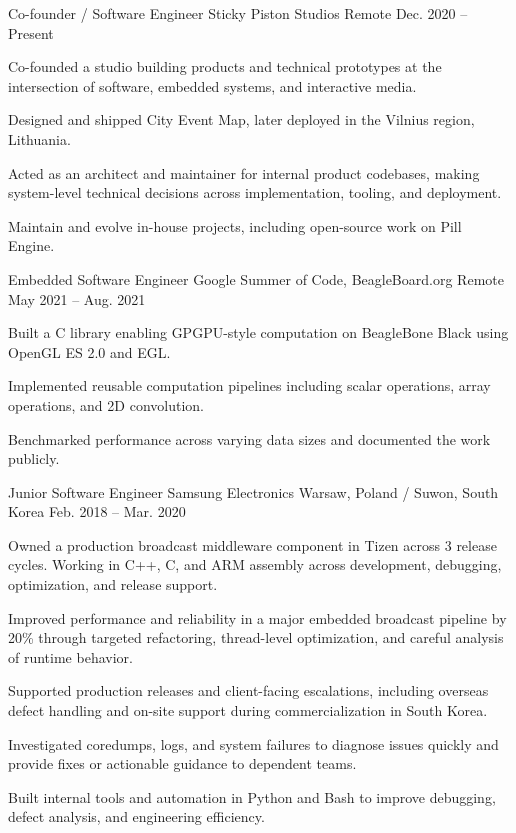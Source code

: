 \begin{cventries}
  \cventry
  {Co-founder / Software Engineer}
  {Sticky Piston Studios}
  {Remote}
  {Dec. 2020 -- Present}
  {
    \begin{cvitems}
      \item {Co-founded a studio building products and technical prototypes at the intersection of software, embedded systems, and interactive media.}
      \item {Designed and shipped City Event Map, later deployed in the Vilnius region, Lithuania.}
      \item {Acted as an architect and maintainer for internal product codebases, making system-level technical decisions across implementation, tooling, and deployment.}
      \item {Maintain and evolve in-house projects, including open-source work on Pill Engine.}
    \end{cvitems}
  }

  \cventry
  {Embedded Software Engineer}
  {Google Summer of Code, BeagleBoard.org}
  {Remote}
  {May 2021 -- Aug. 2021}
  {
    \begin{cvitems}
      \item {Built a C library enabling GPGPU-style computation on BeagleBone Black using OpenGL ES 2.0 and EGL.}
      \item {Implemented reusable computation pipelines including scalar operations, array operations, and 2D convolution.}
      \item {Benchmarked performance across varying data sizes and documented the work publicly.}
    \end{cvitems}
  }

  \cventry
  {Junior Software Engineer}
  {Samsung Electronics}
  {Warsaw, Poland / Suwon, South Korea}
  {Feb. 2018 -- Mar. 2020}
  {
    \begin{cvitems}
      \item {Owned a production broadcast middleware component in Tizen across 3 release cycles. Working in C++, C, and ARM assembly across development, debugging, optimization, and release support.}
      \item {Improved performance and reliability in a major embedded broadcast pipeline by 20\% through targeted refactoring, thread-level optimization, and careful analysis of runtime behavior.}
      \item {Supported production releases and client-facing escalations, including overseas defect handling and on-site support during commercialization in South Korea.}
      \item {Investigated coredumps, logs, and system failures to diagnose issues quickly and provide fixes or actionable guidance to dependent teams.}
      \item {Built internal tools and automation in Python and Bash to improve debugging, defect analysis, and engineering efficiency.}
    \end{cvitems}
  }

\end{cventries}
